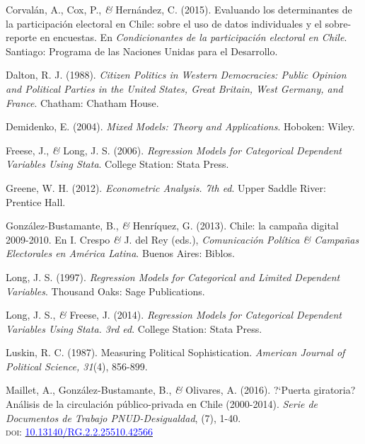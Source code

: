 \documentclass[a4paper]{tufte-handout}
\begin{document}
\begin{list}{}
\item{\small Corvalán, A., Cox, P., {\itshape \&} Hernández, C. (2015). Evaluando los determinantes de la participación electoral en Chile: sobre el uso de datos individuales y el sobre-reporte en encuestas. En {\itshape Condicionantes de la participación electoral en Chile}. Santiago: Programa de las Naciones Unidas para el Desarrollo.}

\item{\small Dalton, R. J. (1988). {\itshape Citizen Politics in Western Democracies: Public Opinion and Political Parties in the United States, Great Britain, West Germany, and France}. Chatham: Chatham House.}

\item{\small Demidenko, E. (2004). {\itshape Mixed Models: Theory and Applications}. Hoboken: Wiley.}

\item{\small Freese, J., {\itshape \&} Long, J. S. (2006). {\itshape Regression Models for Categorical Dependent Variables Using Stata}. College Station: Stata Press.}

\item{\small Greene, W. H. (2012). {\itshape Econometric Analysis. 7th ed}. Upper Saddle River: Prentice Hall.}

\item{\small González-Bustamante, B., {\itshape \&} Henríquez, G. (2013). Chile: la campaña digital 2009-2010. En I. Crespo {\itshape \&} J. del Rey (eds.), {\itshape Comunicación Política \& Campañas Electorales en América Latina}. Buenos Aires: Biblos.}

\item{\small Long, J. S. (1997). {\itshape Regression Models for Categorical and Limited Dependent Variables}. Thousand Oaks: Sage Publications.}

\item{\small Long, J. S., {\itshape \&} Freese, J. (2014). {\itshape Regression Models for Categorical Dependent Variables Using Stata. 3rd ed}. College Station: Stata Press.}

\item{\small Luskin, R. C. (1987). Measuring Political Sophistication. {\itshape American Journal of Political Science, 31}(4), 856-899.}

\item{\small Maillet, A., Gonz\'alez-Bustamante, B., {\itshape \&} Olivares, A. (2016). ?`Puerta giratoria? An\'alisis de la circulaci\'on p\'ublico-privada en Chile (2000-2014). {\itshape Serie de Documentos de Trabajo PNUD-Desigualdad}, (7),  1-40. \\ {\scshape doi:} \href{https://doi.org/10.13140/RG.2.2.25510.42566}{\textcolor{blue}{10.13140/RG.2.2.25510.42566}}}


\end{list}
\end{document}
